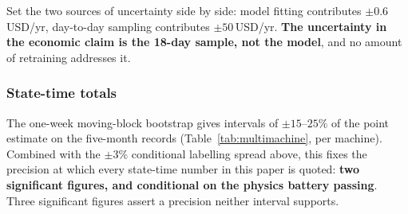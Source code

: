 Set the two sources of uncertainty side by side: model fitting
contributes $\pm0.6$\,USD/yr, day-to-day sampling contributes
$\pm50$\,USD/yr. \textbf{The uncertainty in the economic claim is the
18-day sample, not the model}, and no amount of retraining addresses it.

\subsubsection{State-time totals}

The one-week moving-block bootstrap gives intervals of $\pm15$--$25\%$
of the point estimate on the five-month records
(Table~\ref{tab:multimachine}, per machine). Combined with the $\pm3\%$
conditional labelling spread above, this fixes the precision at which
every state-time number in this paper is quoted: \textbf{two significant
figures, and conditional on the physics battery passing}. Three
significant figures assert a precision neither interval supports.
